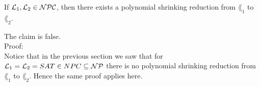 If $\mathcal{L}_1, \mathcal{L}_2 \in \mathcal{N}\mathcal{P}\mathcal{C}$, then there exists a polynomial shrinking
reduction from $\lang_1$ to $\lang_2$.

The claim is false.  \\

Proof:  \\
Notice that in the previous section we saw that for $\mathcal{L}_1 = \mathcal{L}_2 = SAT \in NPC \subseteq \mathcal{N}\mathcal{P}$
there is no polynomial shrinking reduction from $\lang_1$ to $\lang_2$. Hence the same proof applies here.